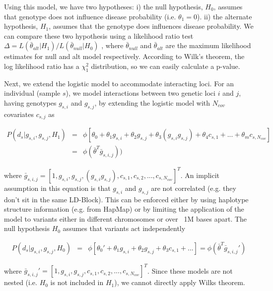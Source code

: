 Using this model, we have two hypotheses: i) the null hypothesis, $H_0$, assumes that genotype does not influence disease probability (i.e. $\theta_1 = 0$). ii) the alternate hypothesis, $H_1$, assumes that the genotype does influences disease probability. We can compare these two hypothesis using a likelihood ratio test $\Delta = L( \bar{\theta}_{alt} | H_1 ) / L( \bar{\theta}_{null} | H_0 ) $ , where $\bar{\theta}_{null}$ and $\bar{\theta}_{alt}$ are the maximum likelihood estimates for null and alt model respectively. According to Wilk's theorem, the log likelihood ratio has a $\chi^2_1$ distribution, so we can easily calculate a p-value.

Next, we extend the logistic model to accommodate interacting loci. For an individual (sample $s$), we model interactions between two genetic loci $i$ and $j$, having genotypes $g_{s,i}$ and $g_{s,j}$, by extending the logistic model with $N_{cov}$ covariates $c_{s,j}$ as

\begin{eqnarray*}
    P( d_s | g_{s,i},g_{s,j}, H_1) & = & \phi[ \theta_0 + \theta_1 g_{s,i} + \theta_2 g_{s,j} + \theta_3 (g_{s,i} g_{s,j}) + \theta_4 c_{s,1} + ... + \theta_m c_{s,N_{cov}} ] \\
    & = & \phi( \bar{\theta}^T \bar{g}_{s,i,j}) )
\end{eqnarray*}

where $\bar{g}_{s,i,j} =  [1, g_{s,i}, g_{s,j}, ( g_{s,i} g_{s,j}), c_{s,1}, c_{s,2}, ..., c_{s,N_{cov}} ]^T$. An implicit assumption in this equation is that $g_{s,i}$ and $g_{s,j}$ are not correlated (e.g. they don't sit in the same LD-Block). This can be enforced either by using haplotype structure information (e.g. from HapMap) or by limiting the application of the model to variants either in different chromosomes or over ~1M bases apart. The null hypothesis $H_0$ assumes that variants act independently

\begin{eqnarray*}
    P( d_s | g_{s,i},g_{s,j}, H_0) & = & 
    \phi[ \theta_0' + \theta_1 g_{s,i} + \theta_2 g_{s,j} + \theta_3 c_{s,1} + ... ] 
    = \phi( \bar{\theta}^T \bar{g}_{s,i,j}' )
\end{eqnarray*}

where $\bar{g}_{s,i,j}' =  [1, g_{s,i}, g_{s,j}, c_{s,1} , c_{s,2}, ..., c_{s,N_{cov}} ]^T$. Since these models are not nested (i.e. $H_0$ is not included in $H_1$), we cannot directly apply Wilks theorem.

